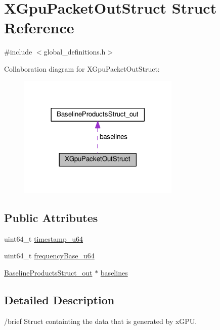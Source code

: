 \hypertarget{struct_x_gpu_packet_out_struct}{}\section{X\+Gpu\+Packet\+Out\+Struct Struct Reference}
\label{struct_x_gpu_packet_out_struct}


{\ttfamily \#include $<$global\+\_\+definitions.\+h$>$}



Collaboration diagram for X\+Gpu\+Packet\+Out\+Struct\+:\nopagebreak
\begin{figure}[H]
\begin{center}
\leavevmode
\includegraphics[width=218pt]{struct_x_gpu_packet_out_struct__coll__graph}
\end{center}
\end{figure}
\subsection*{Public Attributes}
\begin{DoxyCompactItemize}
\item 
uint64\+\_\+t \hyperlink{struct_x_gpu_packet_out_struct_a321383b4aab7bfaa393174230f0aef99}{timestamp\+\_\+u64}
\item 
uint64\+\_\+t \hyperlink{struct_x_gpu_packet_out_struct_a5d10f9d8163cd660b367a088121666d8}{frequency\+Base\+\_\+u64}
\item 
\hyperlink{struct_baseline_products_struct__out}{Baseline\+Products\+Struct\+\_\+out} $\ast$ \hyperlink{struct_x_gpu_packet_out_struct_a225485074c9ce0158bf28c7e1cff158f}{baselines}
\end{DoxyCompactItemize}


\subsection{Detailed Description}
/brief Struct containting the data that is generated by x\+G\+PU.

